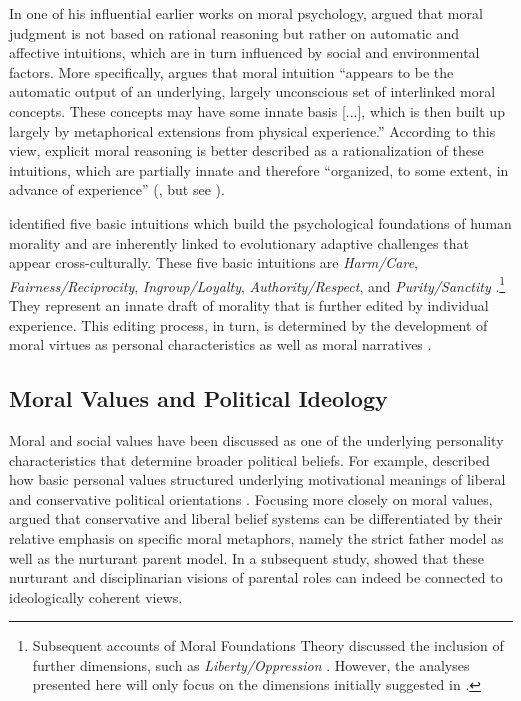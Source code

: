 \documentclass[12pt]{article}
\begin{document}
In one of his influential earlier works on moral psychology, \citet{haidt2001emotional} argued that moral judgment is not based on rational reasoning but rather on automatic and affective intuitions, which are in turn influenced by social and environmental factors. More specifically, \citet[825]{haidt2001emotional} argues that moral intuition ``appears to be the automatic output of an underlying, largely unconscious set of interlinked moral concepts. These concepts may have some innate basis [...], which is then built up largely by metaphorical extensions from physical experience.'' According to this view, explicit moral reasoning is better described as a rationalization of these intuitions, which are partially innate and therefore ``organized, to some extent, in advance of experience'' (\citealt[367]{haidt2008moral}, but see \citealt{suhler2011can}).

\citet{haidt2008moral} identified five basic intuitions which build the psychological foundations of human morality and are inherently linked to evolutionary adaptive challenges that appear cross-culturally. These five basic intuitions are \textit{Harm/Care}, \textit{Fairness/Reciprocity}, \textit{Ingroup/Loyalty}, \textit{Authority/Respect}, and \textit{Purity/Sanctity} \citep[see also][]{graham2011mapping}.\footnote{Subsequent accounts of Moral Foundations Theory discussed the inclusion of further dimensions, such as \textit{Liberty/Oppression} \citep[c.f.][]{graham2013moral,haidt2012righteous}. However, the analyses presented here will only focus on the dimensions initially suggested in \citet{haidt2008moral}.} They represent an innate draft of morality that is further edited by individual experience. This editing process, in turn, is determined by the development of moral virtues as personal characteristics as well as moral narratives \citep{haidt2008moral}.


\subsection{Moral Values and Political Ideology}

Moral and social values have been discussed as one of the underlying personality characteristics that determine broader political beliefs. For example, \citet{piurko2011basic} described how basic personal values structured underlying motivational meanings of liberal and conservative political orientations \citep[see also][]{schwartz2010basic,schwartz2011basic}. Focusing more closely on moral values, \citet{lakoff1995metaphor} argued that conservative and liberal belief systems can be differentiated by their relative emphasis on specific moral metaphors, namely the strict father model as well as the nurturant parent model. In a subsequent study, \citet{barker2006competing} showed that these nurturant and disciplinarian visions of parental roles can indeed be connected to ideologically coherent views.
\end{document}
